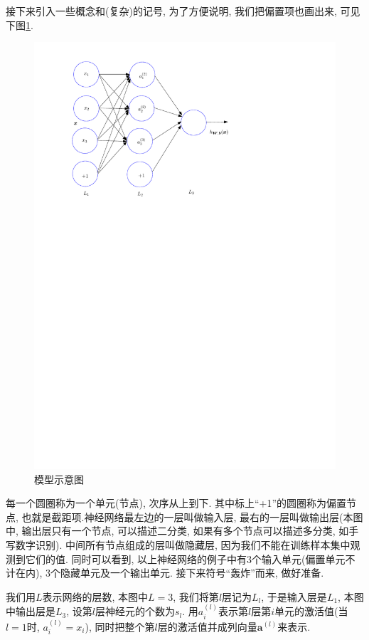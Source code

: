 \documentclass[a4paper,UTF8]{ctexart}
\theoremstyle{plain} \newtheorem{theorem}{定理}[section]
\theoremstyle{plain} \newtheorem{definition}{定义}[section]
\theoremstyle{plain} \newtheorem{lemma}{引理}[section]
\theoremstyle{plain} \newtheorem{proposition}{命题}[section]
\theoremstyle{plain} \newtheorem{example}{例}[section]
\theoremstyle{plain} \newtheorem{remark}{注}[section]
\theoremstyle{plain} \newtheorem{corollary}{推论}[section]
\begin{document}
接下来引入一些概念和(复杂)的记号, 为了方便说明, 我们把偏置项也画出来, 可见下图\ref{notation}.
\begin{figure}[!htb]
  \centering
  \includegraphics[width = 0.60 \textwidth]{notation.pdf}
  \caption{模型示意图}
  \label{notation}
\end{figure}

每一个圆圈称为一个单元(节点), 次序从上到下. 其中标上“+1”的圆圈称为偏置节点, 也就是截距项.神经网络最左边的一层叫做输入层, 最右的一层叫做输出层(本图中, 输出层只有一个节点, 可以描述二分类, 如果有多个节点可以描述多分类, 如手写数字识别). 中间所有节点组成的层叫做隐藏层, 因为我们不能在训练样本集中观测到它们的值. 同时可以看到, 以上神经网络的例子中有3个输入单元(偏置单元不计在内), 3个隐藏单元及一个输出单元. 接下来符号“轰炸”而来, 做好准备.

我们用$L$表示网络的层数, 本图中$L = 3$, 我们将第$l$层记为$L_{l}$, 于是输入层是$L_{1}$, 本图中输出层是$L_{3}$, 设第$l$层神经元的个数为$s_{l}$. 用$a_{i}^{(l)}$表示第$l$层第$i$单元的激活值(当$l = 1$时, $a_{i}^{(l)} = x_{i}$), 同时把整个第$l$层的激活值并成列向量$\bm{a}^{(l)}$来表示.
\end{document}
